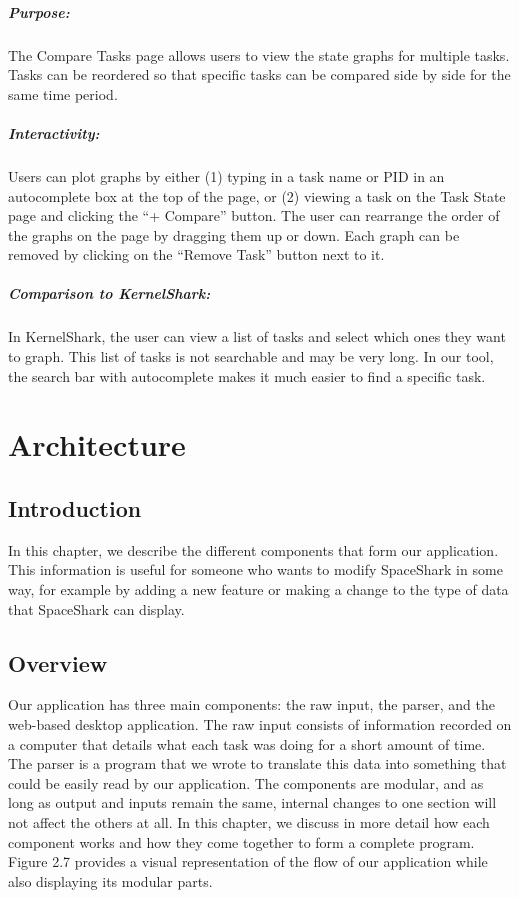 \documentclass{hmcclinic}
\begin{document}
\paragraph{Purpose:}
The Compare Tasks page allows users to view the state graphs for multiple tasks. Tasks can be reordered so that specific tasks can
be compared side by side for the same time period. 

\paragraph{Interactivity:}
Users can plot graphs by either (1) typing in a task name or PID in an autocomplete box at the top of the page, or
(2) viewing a task on the Task State page and clicking the ``+ Compare''
button. The user can
rearrange the order of the graphs on the page by dragging them up or down. Each
graph can be removed by clicking on the ``Remove Task'' button next to it.
    
\paragraph{Comparison to KernelShark:}
    In KernelShark, the user can view a list of tasks and select which ones they
    want to graph.  This list of tasks is not searchable and may be very long.
    In our tool, the search bar with autocomplete makes it much easier to find a
    specific task.

\chapter{Architecture}

\section{Introduction}
In this chapter, we describe the different components that form our application.
This information is useful for someone who wants to modify SpaceShark in some
way, for example by adding a new feature or making a change to the type of data that SpaceShark can display.

\section{Overview}

  Our application has three main components: the raw input, the parser,
  and the web-based desktop application. The raw input consists of information recorded on a computer that details what each task was doing for a short amount of time. The parser is a program that we wrote to translate this data into something that could be easily read by our application. The components are modular, and
  as long as output and inputs remain the same, internal changes to one section will
  not affect the others at all. In this chapter, we  discuss in more detail how each
  component works and how they come together to form a complete program.
  Figure 2.7 provides a visual representation of the flow of our application
  while also displaying its modular parts.
  
\end{document}
